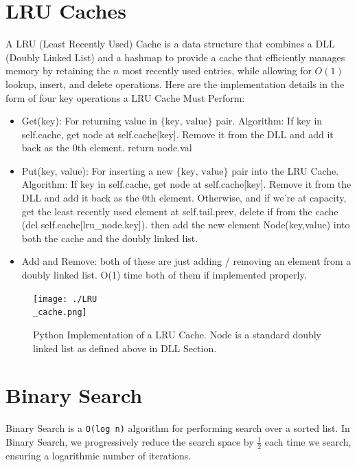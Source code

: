 \documentclass[12pt]{article}
\begin{document}
\section{LRU Caches}
A LRU (Least Recently Used) Cache is a data structure that combines a DLL (Doubly Linked List) and a hashmap to provide a cache that efficiently manages memory by retaining the \(n\) most recently used entries, while allowing for \(O(1)\) lookup, insert, and delete operations. Here are the implementation details in the form of four key operations a LRU Cache Must Perform:
\begin{itemize}
\item{Get(key)}: For returning value in \(\{\text{key, value}\}\) pair. Algorithm: If key in self.cache, get node at self.cache[key]. Remove it from the DLL and add it back as the 0th element. return node.val 
\item{Put(key, value)}: For inserting a new \(\{\text{key, value}\}\) pair into the LRU Cache. Algorithm: If key in self.cache, get node at self.cache[key]. Remove it from the DLL and add it back as the 0th element. Otherwise, and if we're at capacity, get the least recently used element at self.tail.prev, delete if from the cache (del self.cache[lru\_node.key]). then add the new element Node(key,value) into both the cache and the doubly linked list.
\item{Add and Remove}: both of these are just adding / removing an element from a doubly linked list. O(1) time both of them if implemented properly.
\end{itemize}
\begin{figure}[H]
    \centering
    \texttt{[image: ./LRU\\\_cache.png]} %
	\caption{Python Implementation of a LRU Cache. Node is a standard doubly linked list as defined above in DLL Section.}
\end{figure}
\section{Binary Search}
Binary Search is a \texttt{O(log n)} algorithm for performing search over a sorted list. In Binary Search, we progressively reduce the search space by \(\frac{1}{2}\) each time we search, ensuring a logarithmic number of iterations. \\
\end{document}
